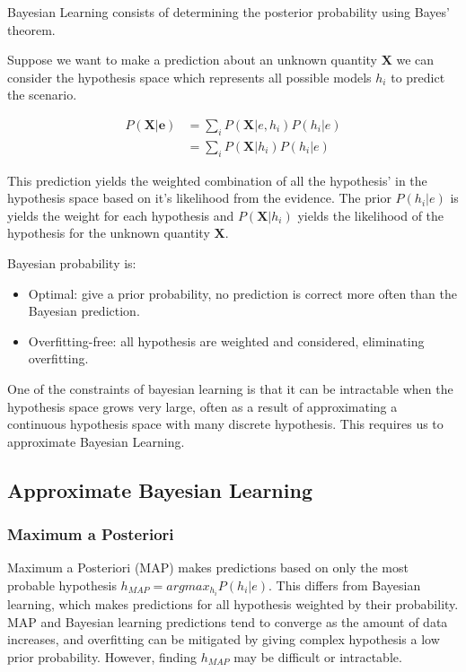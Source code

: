 \documentclass[12pt]{article}
\begin{document}
    Bayesian Learning consists of determining the posterior probability using Bayes' theorem.
    
    Suppose we want to make a prediction about an unknown quantity $\boldsymbol{X}$ we can consider the hypothesis space which represents all possible models $h_i$ to predict the scenario.

    \begin{align}
        P(\boldsymbol{X}|\boldsymbol{e}) &= \sum_i P(\boldsymbol{X}|e, h_i)P(h_i|e) \\
        &= \sum_i P(\boldsymbol{X}|h_i)P(h_i|e)
    \end{align}

    This prediction yields the weighted combination of all the hypothesis' in the hypothesis space based on it's likelihood from the evidence. The prior $P(h_i | e)$ is yields the weight for each hypothesis and $P(\boldsymbol{X}|h_i)$ yields the likelihood
    of the hypothesis for the unknown quantity $\boldsymbol{X}$.

    Bayesian probability is:
    \begin{itemize}
        \item Optimal: give a prior probability, no prediction is correct more often than the Bayesian prediction.
        \item Overfitting-free: all hypothesis are weighted and considered, eliminating overfitting.
    \end{itemize}

    One of the constraints of bayesian learning is that it can be intractable when the hypothesis space grows very large, often as a result of approximating a continuous hypothesis space with many discrete hypothesis. This requires us to approximate 
    Bayesian Learning.

    \subsection{Approximate Bayesian Learning}
    \subsubsection{Maximum a Posteriori}
        Maximum a Posteriori (MAP) makes predictions based on only the most probable hypothesis $h_{MAP} = argmax_{h_i}P(h_i | e)$. This differs from Bayesian learning, which makes predictions for all hypothesis weighted by their probability. 
        MAP and Bayesian learning predictions tend to converge as the amount of data increases, and overfitting can be mitigated by giving complex hypothesis a low prior probability. However, finding $h_{MAP}$ may be difficult or intractable.
\end{document}

